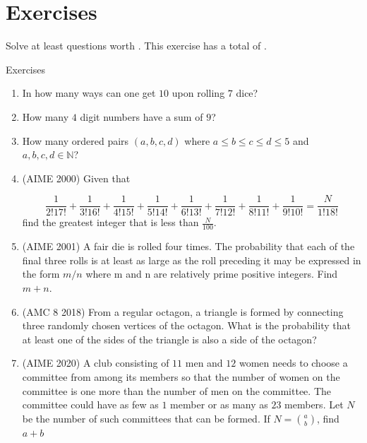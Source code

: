 \section{Exercises}
Solve at least questions worth . This exercise has a total of .
\begin{xcb}{Exercises}
\begin{enumerate}
\item {} In how many ways can one get $10$ upon rolling $7$ dice?
\item {} How many $4$ digit numbers have a sum of $9$?
\item {} How many ordered pairs $(a,b,c,d)$ where $a \le b \le c \le d \le 5$ and $a,b,c,d \in \mathbb{N}$?
\begin{hint}
\end{hint}
\item (AIME 2000)  Given that\par
\[\frac 1{2!17!}+\frac 1{3!16!}+\frac 1{4!15!}+\frac 1{5!14!}+\frac 1{6!13!}+\frac 1{7!12!}+\frac 1{8!11!}+\frac 1{9!10!}=\frac N{1!18!}\]
find the greatest integer that is less than $\frac N{100}$.
\begin{hint}
    \par
\end{hint}
\item(AIME 2001)  A fair die is rolled four times. The probability that each of the final three rolls is at least as large as the roll preceding it may be expressed in the form $m/n$ where m and n are relatively prime positive integers. Find $m + n$.
\item (AMC 8 2018)  From a regular octagon, a triangle is formed by connecting three randomly chosen vertices of the octagon. What is the probability that at least one of the sides of the triangle is also a side of the octagon?
\begin{hint}
\end{hint}
\item(AIME 2020)  A club consisting of $11$ men and $12$ women needs to choose a committee from among its members so that the number of women on the committee is one more than the number of men on the committee. The committee could have as few as $1$ member or as many as $23$ members. Let $N$ be the number of such committees that can be formed. If $N=\binom{a}{b}$, find $a + b$

\end{enumerate}
\end{xcb}
